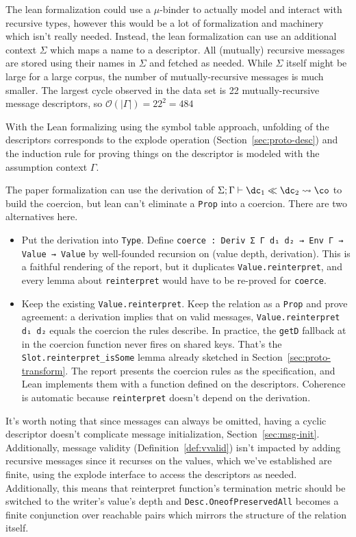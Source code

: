 The lean formalization could use a $\mu$-binder to actually model and interact
with recursive types, however this would be a lot of formalization and machinery
which isn't really needed. Instead, the lean formalization can use an additional
context $\Sigma$ which maps a name to a descriptor. All (mutually) recursive messages
are stored using their names in $\Sigma$ and fetched as needed. While $\Sigma$ itself
might be large for a large corpus, the number of mutually-recursive messages is
much smaller. The largest cycle observed in the data set is 22
mutually-recursive message descriptors, so $\mathcal{O}(|\Gamma|) = 22^2 = 484$

With the Lean formalizing using the symbol table approach, unfolding of the
descriptors corresponds to the explode operation (Section~\ref{sec:proto-desc})
and the induction rule for proving things on the descriptor is modeled with the
assumption context $\Gamma$.

The paper formalization can use the derivation of
$\judg{\Gamma}{\dc_1 \dcompat \dc_2 \coerce \co}$ to build the coercion, but lean can't
eliminate a \texttt{Prop} into a coercion. There are two alternatives here.
\begin{itemize}
\item Put the derivation into \texttt{Type}. Define \texttt{coerce : Deriv Σ Γ
    d₁ d₂ → Env Γ → Value → Value} by well-founded recursion on (value depth,
  derivation). This is a faithful rendering of the report, but it duplicates
  \texttt{Value.reinterpret}, and every lemma about \texttt{reinterpret} would
  have to be re-proved for \texttt{coerce}.
\item Keep the existing \texttt{Value.reinterpret}. Keep the relation as a
  \texttt{Prop} and prove agreement: a derivation implies that on valid
  messages, \texttt{Value.reinterpret d₁ d₂} equals the coercion the rules
  describe. In practice, the \texttt{getD} fallback at in the coercion function
  never fires on shared keys. That's the \texttt{Slot.reinterpret\_isSome} lemma
  already sketched in Section~\ref{sec:proto-transform}. The report presents the
  coercion rules as the specification, and Lean implements them with a function
  defined on the descriptors. Coherence is automatic because
  \texttt{reinterpret} doesn't depend on the derivation.
\end{itemize}

It's worth noting that since messages can always be omitted, having a cyclic
descriptor doesn't complicate message initialization,
Section~\ref{sec:msg-init}. Additionally, message validity
(Definition~\ref{def:vvalid}) isn't impacted by adding recursive messages since
it recurses on the values, which we've established are finite, using the explode
interface to access the descriptors as needed. Additionally, this means that
reinterpret function's termination metric should be switched to the writer's
value's depth and \texttt{Desc.OneofPreservedAll} becomes a finite conjunction
over reachable pairs which mirrors the structure of the relation itself. %

